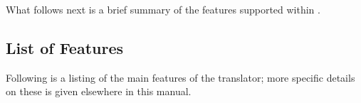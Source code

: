 
\bigskip\noindent
What follows next is a brief summary of the features supported
within \latextohtml{}.\html{\dots}


\subsection{List of Features\label{features:ovw}}
%
Following is a listing of the main features of the translator;
more specific details on these is given elsewhere in this manual.

